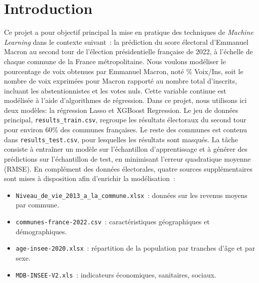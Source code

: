 \section{Introduction}




Ce projet a pour objectif principal la mise en pratique des techniques de \textit{Machine Learning} dans le contexte suivant~: la prédiction du score électoral d'Emmanuel Macron au second tour de l'élection présidentielle française de 2022, à l'échelle de chaque commune de la France métropolitaine.
Nous voulons modéliser le pourcentage de voix obtenues par Emmanuel Macron, noté \% Voix/Ins, soit le nombre de voix exprimées pour Macron rapporté au nombre total d'inscrits, incluant les abstentionnistes et les votes nuls. Cette variable continue est modélisée à l'aide d'algorithmes de régression. Dans ce projet, nous utilisons ici deux modèles: la régression Lasso et XGBoost Regression.
Le jeu de données principal, \texttt{results\_train.csv}, regroupe les résultats électoraux du second tour pour environ 60\% des communes françaises. Le reste des communes est contenu dans \texttt{results\_test.csv}, pour lesquelles les résultats sont masqués. La tâche consiste à entraîner un modèle sur l'échantillon d'apprentissage et à générer des prédictions sur l'échantillon de test, en minimisant l'erreur quadratique moyenne (RMSE).
En complément des données électorales, quatre sources supplémentaires sont mises à disposition afin d’enrichir la modélisation~:

\begin{itemize}
  \item \texttt{Niveau\_de\_vie\_2013\_a\_la\_commune.xlsx}~: données sur les revenus moyens par commune.
  \item \texttt{communes-france-2022.csv}~: caractéristiques géographiques et démographiques.
  \item \texttt{age-insee-2020.xlsx}~: répartition de la population par tranches d’âge et par sexe.
  \item \texttt{MDB-INSEE-V2.xls}~: indicateurs économiques, sanitaires, sociaux.

\end{itemize}

